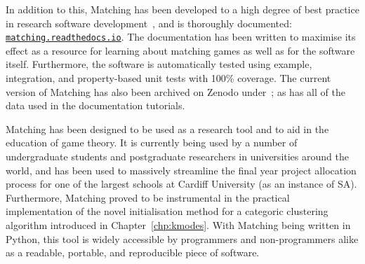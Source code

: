 In addition to this, Matching has been developed to a high degree of best
practice in research software development~\cite{Jimenez2017}, and is thoroughly
documented:
\href{https://matching.readthedocs.io}{\nolinkurl{matching.readthedocs.io}}. The
documentation has been written to maximise its effect as a resource for learning
about matching games as well as for the software itself. Furthermore, the
software is automatically tested using example, integration, and property-based
unit tests with 100\% coverage. The current version of Matching has also been
archived on Zenodo under~; as has all of the data
used in the documentation tutorials.

Matching has been designed to be used as a research tool and to aid in the
education of game theory. It is currently being used by a number of
undergraduate students and postgraduate researchers in universities around the
world, and has been used to massively streamline the final year project
allocation process for one of the largest schools at Cardiff University (as an
instance of SA). Furthermore, Matching proved to be instrumental in the
practical implementation of the novel initialisation method for a categoric
clustering algorithm introduced in Chapter~\ref{chp:kmodes}. With Matching being
written in Python, this tool is widely accessible by programmers and
non-programmers alike as a readable, portable, and reproducible piece of
software.
